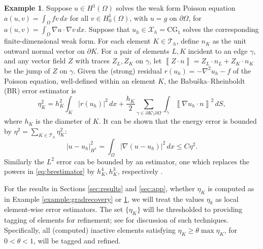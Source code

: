 \documentclass[]{interact}
\theoremstyle{plain}%
\theoremstyle{definition}
\newtheorem{example}[theorem]{Example}
\theoremstyle{remark}
\newcommand{\grad}{\nabla}
\newcommand{\cT}{\mathcal{T}}
\newcommand{\cX}{\mathcal{X}}
\newcommand{\CG}{\text{CG}}
\begin{document}
\begin{example}  \label{example:br}  Suppose $u \in H^1(\Omega)$ solves the weak form Poisson equation $a(u,v) = \int_\Omega f v\,dx$ for all $v \in H^1_0(\Omega)$, with $u=g$ on $\partial \Omega$, for $a(u,v)=\int_\Omega \grad u\cdot \grad v\,dx$.  Suppose that $u_h\in\cX_h=\CG_1$ solves the corresponding finite-dimensional weak form.  For each element $K \in \cT_h$, define $n_K$ as the unit outward normal vector on $\partial K$.  For a pair of elements $L,K$ incident to an edge $\gamma$, and any vector field $Z$ with traces $Z_L,Z_K$ on $\gamma$, let $\left\llbracket Z \cdot n \right\rrbracket = Z_L \cdot n_L + Z_K \cdot n_K$ be the jump of $Z$ on $\gamma$.  Given the (strong) residual $r(u_h)=-\nabla^2 u_h - f$ of the Poisson equation, well-defined within an element $K$, the Babu\v{s}ka--Rheinboldt (BR) \cite{BabuskaRheinboldt1979} error estimator is
\begin{equation} \label{eq:brestimator}
\eta_K^2 = h_K^2 \int_K |r(u_h)|^2\,dx + \frac{h_K}{2} \sum_{\gamma \in \partial K \setminus \partial \Omega} \int_{\gamma} \left\llbracket \grad u_h \cdot n \right\rrbracket^2\,dS,
\end{equation}
where $h_K$ is the diameter of $K$.  It can be shown \cite[Chapter 2]{AinsworthOden2000} that the energy error is bounded by $\eta^2 = \sum_{K\in\cT_h} \eta_K^2$:
\begin{equation} \label{eq:brbound}
|u-u_h|_{H^1}^2 = \int_\Omega |\grad(u-u_h)|^2\,dx \le C \eta^2.
\end{equation}
Similarly the $L^2$ error can be bounded by an estimator, one which replaces the powers in \eqref{eq:brestimator} by $h_K^4,h_K^3$, respectively \cite[Section 2.4]{AinsworthOden2000}.
\end{example}

For the results in Sections \ref{sec:results} and \ref{sec:app}, whether $\eta_K$ is computed as in Example \ref{example:gradrecovery} or \ref{example:br}, we will treat the values $\eta_k$ as local element-wise error estimators.  The set $\{\eta_K\}$ will be thresholded to providing tagging of elements for refinement; see \cite[Section 4.2]{BangerthRannacher2003} for discussion of such techniques.  Specifically, all (computed) inactive elements satisfying $\eta_K \ge \theta \max \eta_K$, for $0<\theta<1$, will be tagged and refined.
\end{document}
